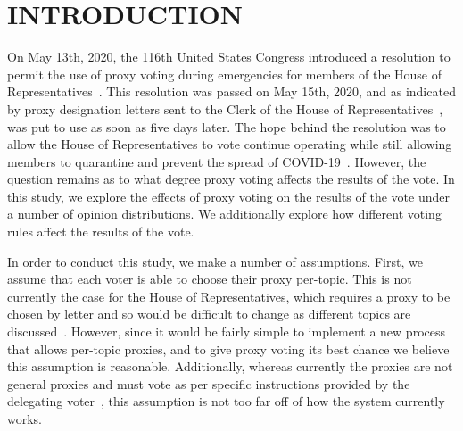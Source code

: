 %
%

\chapter{INTRODUCTION}\label{ch:introduction}
\thispagestyle{empty}

On May 13th, 2020, the 116th United States Congress introduced a resolution
to permit the use of proxy voting during emergencies for members of the House of
Representatives~\cite{Congress.gov2020}.
This resolution was passed on May 15th, 2020, and as indicated by proxy designation
letters sent to the Clerk of the House of Representatives~\cite{Clerk.House.gov2022},
was put to use as soon as five days later.
The hope behind the resolution was to allow the House of Representatives
to vote continue operating while still allowing members to quarantine and
prevent the spread of COVID-19~\cite{Congress.gov2020}.
However, the question remains as to what degree proxy voting affects the results of
the vote.
In this study, we explore the effects of proxy voting on the results of the vote
under a number of opinion distributions.
We additionally explore how different voting rules affect the results of the vote.


In order to conduct this study, we make a number of assumptions.
First, we assume that each voter is able to choose their proxy per-topic.
This is not currently the case for the House of Representatives, which requires
a proxy to be chosen by letter and so would be difficult to change as different
topics are discussed~\cite{Congress.gov2020}.
However, since it would be fairly simple to implement a new process that allows
per-topic proxies, and to give proxy voting its best chance we believe this assumption
is reasonable.
Additionally, whereas currently the proxies are not general proxies and must vote as
per specific instructions provided by the delegating
voter~\cite{CERP2020, Congress.gov2020}, this assumption is not too far off of how
the system currently works.

